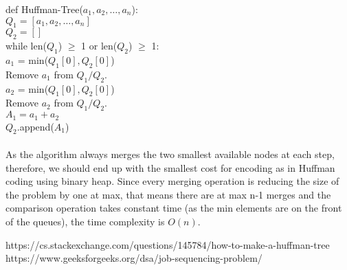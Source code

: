 \documentclass{article}[12pt]
\begin{document}
def {Huffman-Tree}($a_1, a_2, \dots, a_n$):\\
\hspace*{2em} $Q_1 = [a_1, a_2, \dots, a_n]$\\
\hspace*{2em} $Q_2 = []$ \\
\hspace*{2em}while len($Q_1$) $\ge$ 1 or len($Q_2$) $\ge$ 1: \\
\hspace*{3em} $a_1$ = min($Q_1[0], Q_2[0]$) \\ 
\hspace*{3em} Remove $a_1$ from $Q_1/Q_2$. \\
\hspace*{3em} $a_2$ = min($Q_1[0], Q_2[0]$) \\
\hspace*{3em} Remove $a_2$ from $Q_1/Q_2$. \\
\hspace*{3em} $A_1 = a_1 + a_2$\\
\hspace*{3em} $Q_2$.append($A_1$)\\
\\
As the algorithm always merges the two smallest available nodes at each step, therefore, we should end up with the smallest cost for encoding as in Huffman coding using binary heap. 
Since every merging operation is reducing the size of the problem by one at max, that means there are at max n-1 merges and the comparison operation  takes constant time (as the min elements are on the front of the queues), the time complexity is $O(n)$.

\begin{thebibliography}{99}
 https://cs.stackexchange.com/questions/145784/how-to-make-a-huffman-tree
https://www.geeksforgeeks.org/dsa/job-sequencing-problem/
\end{thebibliography}
\end{document}
